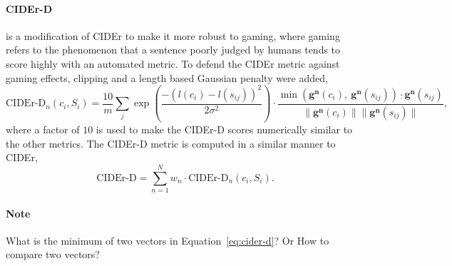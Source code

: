 \paragraph{CIDEr-D} is a modification of CIDEr to make it more robust to gaming, 
where gaming refers to the phenomenon that a sentence poorly judged by humans tends to score highly with an automated metric.
To defend the CIDEr metric against gaming effects,
clipping and a length based Gaussian penalty were added,
\begin{equation}
\label{eq:cider-d}
\text{CIDEr-D}_n (c_i, S_i) = 
\frac{10}{m} \sum_j \exp\left( \frac{-\left( l(c_i) - l(s_{ij}) \right)^2} {2 \sigma^2} \right) \cdot
\frac{\min\left( \mathbf{g}^\mathbf{n}(c_i),~\mathbf{g}^\mathbf{n}(s_{ij}) \right) \cdot \mathbf{g}^\mathbf{n}(s_{ij})}
     {\|\mathbf{g}^\mathbf{n}(c_i)\| \|\mathbf{g}^\mathbf{n}(s_{ij})\|},
\end{equation}
where a factor of $10$ is used to make the CIDEr-D scores numerically similar to the other metrics. 
The CIDEr-D metric is computed in a similar manner to CIDEr,
\begin{equation*}
\text{CIDEr-D} = \sum_{n=1}^N w_n \cdot \text{CIDEr-D}_n(c_i, S_i).
\end{equation*}

{\it
\paragraph{Note} What is the minimum of two vectors in Equation~\ref{eq:cider-d}? Or How to compare two vectors?
}
